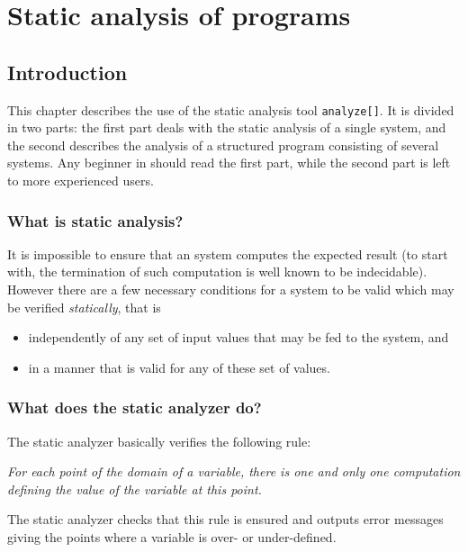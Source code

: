 \chapter{Static analysis of {\alfa} programs\label{static}\label{chapanalyze}}

\section{Introduction}


This chapter describes the use of the static analysis tool
\texttt{analyze[]}.  
It is divided in two parts: the first part deals with the
static analysis of a single system, and the second describes the
analysis of a structured program consisting of several systems. Any
beginner in {\alfa} should read the first part, while the
second part is left to more experienced users.



\subsection{What is static analysis?}

It is impossible to ensure that an {\alfa} system computes the
expected result (to start with, the termination of such computation is
well known to be indecidable). However there are a few necessary
conditions for a system to be valid which may be verified
\emph{statically}, that is

\begin{itemize}

\item independently of any set of input values that may be fed to the
system, and
\item in a manner that is valid for any of these set of values.

\end{itemize}


\subsection{What does the static analyzer do?}

The {\alfa} static analyzer basically verifies the following rule:

\emph{For each point of the domain of a variable, there is
one and only one computation defining the value of the variable at
this point.}

The static analyzer checks that this rule is ensured and outputs error
messages giving the points where a variable is over- or under-defined.



